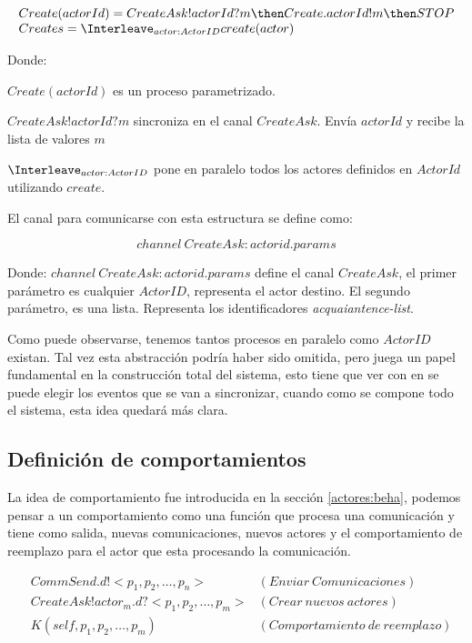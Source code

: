 \[
\begin{array}{l}
Create(actorId) = CreateAsk!actorId?m \then Create.actorId!m \then STOP \\
Creates = \Interleave_{actor : ActorID} create(actor)
\end{array}
\]

Donde:

\begin{description}
 \item $Create(actorId)$ es un proceso parametrizado.
 \item $CreateAsk!actorId?m$ sincroniza en el canal $CreateAsk$. Envía $actorId$ y recibe la lista de valores $m$
 \item $\Interleave_{actor : ActorID}$ pone en paralelo todos los actores definidos en $ActorId$ utilizando $create$. 
\end{description}

El canal para comunicarse con esta estructura se define como:

\[
channel\ CreateAsk:actorid.params
\]

Donde: $channel\ CreateAsk:actorid.params$ define el canal $CreateAsk$, el primer parámetro es cualquier $ActorID$, representa el actor destino. El segundo parámetro, es una lista. Representa los identificadores \textit{acquaiantence-list}. 

Como puede observarse, tenemos tantos procesos en paralelo como $ActorID$ existan. Tal vez esta abstracción podría haber sido omitida, pero juega un papel fundamental en la construcción total del sistema, esto tiene que ver con en \CSP se puede elegir los eventos \cite[chap.~2,p.~55]{Roscoe:1997:TPC:550448} que se van a sincronizar, cuando como se compone todo el sistema, esta idea quedará más clara.

\subsection{Definición de comportamientos}
La idea de comportamiento fue introducida en la sección \ref{actores:beha}, podemos pensar a un comportamiento como una función que procesa una comunicación y tiene como salida, nuevas comunicaciones, nuevos actores y el comportamiento de reemplazo para el actor que esta procesando la comunicación.

\begin{align*}
&CommSend.d!<p_1, p_2, \ldots, p_n> & (Enviar\ Comunicaciones) \\ 
&CreateAsk!actor_m.d?<p_1, p_2, \ldots, p_m> & (Crear\ nuevos\ actores)\\
&K(self, p_1, p_2, \ldots, p_m)  & (Comportamiento\ de\ reemplazo)
\end{align*}

